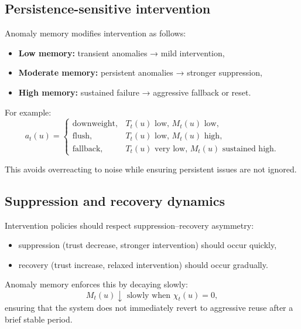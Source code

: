 \documentclass[11pt]{article}
\theoremstyle{definition}
\theoremstyle{plain}
\begin{document}

\subsection{Persistence-sensitive intervention}

Anomaly memory modifies intervention as follows:
\begin{itemize}[leftmargin=1.5em]
    \item \textbf{Low memory:} transient anomalies → mild intervention,
    \item \textbf{Moderate memory:} persistent anomalies → stronger suppression,
    \item \textbf{High memory:} sustained failure → aggressive fallback or reset.
\end{itemize}

For example:
\begin{equation}
a_t(u)=
\begin{cases}
\mathrm{downweight}, & T_t(u)\text{ low, }M_t(u)\text{ low},\\
\mathrm{flush}, & T_t(u)\text{ low, }M_t(u)\text{ high},\\
\mathrm{fallback}, & T_t(u)\text{ very low, }M_t(u)\text{ sustained high}.
\end{cases}
\end{equation}

This avoids overreacting to noise while ensuring persistent issues are not ignored.


\subsection{Suppression and recovery dynamics}

Intervention policies should respect suppression–recovery asymmetry:

\begin{itemize}[leftmargin=1.5em]
    \item suppression (trust decrease, stronger intervention) should occur quickly,
    \item recovery (trust increase, relaxed intervention) should occur gradually.
\end{itemize}

Anomaly memory enforces this by decaying slowly:
\begin{equation}
M_t(u)\downarrow \text{ slowly when }\chi_t(u)=0,
\end{equation}
ensuring that the system does not immediately revert to aggressive reuse after a brief stable period.
\end{document}
